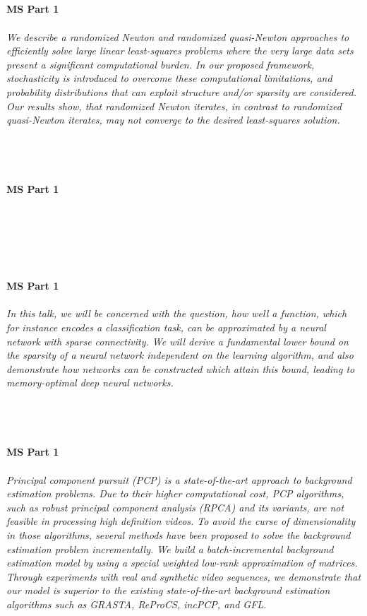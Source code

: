 \begin{multicols}{2}
\\ 
    \\
    \\\\
    \noindent\textbf{MS Part 1}\\
\\  
    \textit{We describe a randomized Newton and randomized quasi-Newton approaches to efficiently solve large linear least-squares problems where the very large data sets present a significant computational burden. In our proposed framework, stochasticity is introduced to overcome these computational limitations, and probability distributions that can exploit structure and/or sparsity are considered. Our results show, that randomized Newton iterates, in contrast to randomized quasi-Newton iterates, may not converge to the desired least-squares solution.}\\
\\ 
    \\
    \\\\
    \noindent\textbf{MS Part 1}\\
\\  
    \textit{}\\
\\ 
    \\
    \\\\
    \noindent\textbf{MS Part 1}\\
\\  
    \textit{In this talk, we will be concerned with the question, how well a function, which for instance encodes a classification task, can be approximated by a neural network with sparse connectivity. We will derive a fundamental lower bound on the sparsity of a neural network independent on the learning algorithm, and also demonstrate how networks can be constructed which attain this bound, leading to memory-optimal deep neural networks.}\\
\\ 
    \\
    \\\\
    \noindent\textbf{MS Part 1}\\
\\  
    \textit{Principal component pursuit (PCP) is a state-of-the-art approach to background estimation problems. Due to their higher computational cost, PCP algorithms, such as robust principal component analysis (RPCA) and its variants, are not feasible in processing high definition videos. To avoid the curse of dimensionality in those algorithms, several methods have been proposed to solve the background estimation problem incrementally. We build a batch-incremental background estimation model by using a special weighted low-rank approximation of matrices. Through experiments with real and synthetic video sequences, we demonstrate that our model is superior to the existing state-of-the-art background estimation algorithms such as GRASTA, ReProCS, incPCP, and GFL.}\\

\end{multicols}
